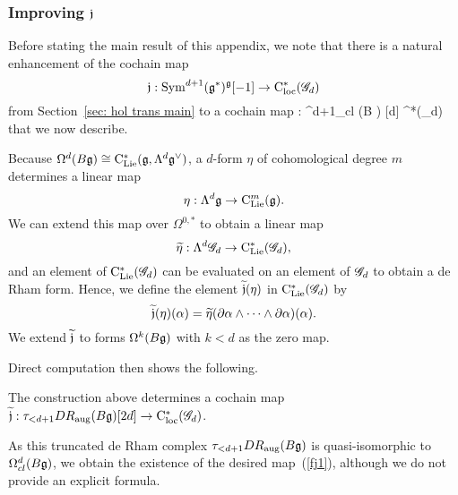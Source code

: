 \subsubsection{Improving $\mathfrak j$}

Before stating the main result of this appendix, we note that there is a natural enhancement of the cochain map
\[
\mathfrak j : {\rm Sym}^{d+1} (\mathfrak g^*)^{\mathfrak g} [-1] \to {\rm C}_{\rm loc}^*(\mathscr G_d)
\]
from Section~\ref{sec: hol trans main} to a cochain map
\beqn\label{fj1}
\fj : \Omega^{d+1}_{cl} (B \fg) [d] \to \cloc^*(\sG_d)  
\eeqn
that we now describe. 

Because $\Omega^d(B \mathfrak g) \cong {\rm C}_{{\rm Lie}}^*(\mathfrak g, \Lambda^{d} \mathfrak g^\vee)$, 
a $d$-form $\eta$ of cohomological degree $m$ determines a linear map
\[
\eta: \Lambda^d \mathfrak g \to {\rm C}_{{\rm Lie}}^m(\mathfrak g).
\]
We can extend this map over $\Omega^{0,*}$ to obtain a linear map
\[
\widetilde{\eta}: \Lambda^d \mathscr G_d \to {\rm C}_{{\rm Lie}}^*(\mathscr G_d),
\]
and an element of ${\rm C}_{{\rm Lie}}^*(\mathscr G_d)$ can be evaluated on an element of $\mathscr G_d$ to obtain a de Rham form.
Hence, we define the element $\widetilde{\mathfrak j}(\eta)$ in ${\rm C}_{{\rm Lie}}^*(\mathscr G_d)$ by 
\[
\widetilde{\mathfrak j} (\eta) (\alpha) = \widetilde{\eta}(\partial \alpha \wedge \cdots \wedge \partial \alpha) (\alpha) .
\]
We extend $\widetilde{\mathfrak j}$ to forms $\Omega^k(B\mathfrak g)$ with $k < d$ as the zero map.

Direct computation then shows the following.

\begin{lem}
The construction above determines a cochain map $\widetilde{\mathfrak j}: \tau_{<d+1} DR_{\rm aug}(B\mathfrak g) [2d] \to {\rm C}_{\rm loc}^*(\mathscr G_d)$.
\end{lem}

As this truncated de Rham complex $\tau_{<d+1} DR_{\rm aug}(B\mathfrak g)$ is quasi-isomorphic to  $\Omega^d_{cl}(B\mathfrak g)$, 
we obtain the existence of the desired map~(\ref{fj1}),
although we do not provide an explicit formula.

%

